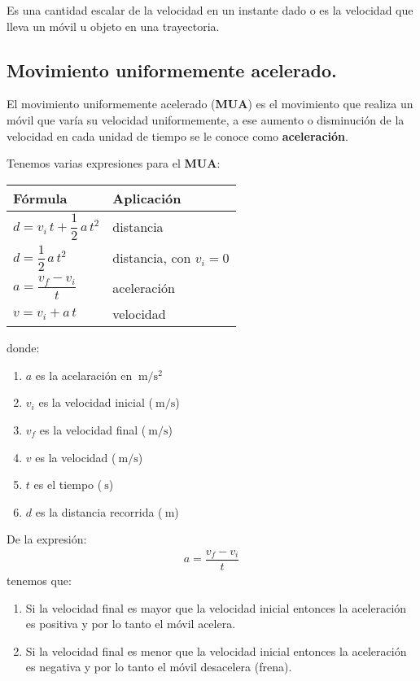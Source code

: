 \documentclass[14pt]{extarticle}
\begin{document}
Es una cantidad escalar de la velocidad en un instante dado o es la velocidad que lleva un móvil u objeto en una trayectoria.

\subsection{Movimiento uniformemente acelerado.}

El movimiento uniformemente acelerado (\textbf{MUA}) es el movimiento que realiza un móvil que varía su velocidad uniformemente, a ese aumento o disminución de la velocidad en cada unidad de tiempo se le conoce como \textbf{aceleración}.
\par
Tenemos varias expresiones para el \textbf{MUA}:
\begin{table}[H]
\renewcommand{\arraystretch}{2.5}
\centering
\begin{tabular}{l | l}
Fórmula & Aplicación \\ \hline
$d = v_{i} \, t + \dfrac{1}{2} \, a \, t^{2}$ & distancia \\ \hline
$d = \dfrac{1}{2} \, a \, t^{2}$ & distancia, con $v_{i} = 0$ \\ \hline
$a = \dfrac{v_{f} - v_{i}}{t}$ & aceleración \\ \hline
$v = v_{i} + a \, t$ & velocidad \\ \hline
\end{tabular}
\end{table}
donde:
\begin{enumerate}[label=\roman*)]
\item $a$ es la acelaración en $\SI{}{\meter\per\square\second}$
\item $v_{i}$ es la velocidad inicial ($\SI{}{\meter\per\second}$)
\item $v_{f}$ es la velocidad final ($\SI{}{\meter\per\second}$)
\item $v$ es la velocidad ($\SI{}{\meter\per\second}$)
\item $t$ es el tiempo ($\SI{}{\second}$)
\item $d$ es la distancia recorrida ($\SI{}{\meter}$)
\end{enumerate}

\newpage

De la expresión:
\begin{align*}
a = \dfrac{v_{f} - v_{i}}{t}
\end{align*}
tenemos que:
\begin{enumerate}
\item Si la velocidad final es mayor que la velocidad inicial entonces la aceleración es positiva y por lo tanto el móvil acelera.
\item Si la velocidad final es menor que la velocidad inicial entonces la aceleración es negativa y por lo tanto el móvil desacelera (frena).
\end{enumerate}
\end{document}
